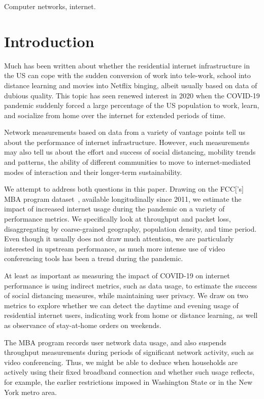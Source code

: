 \documentclass[conference,10pt]{IEEEtran}
\begin{document}
\begin{IEEEkeywords}
Computer networks, internet.
\end{IEEEkeywords}

\glsresetall

\section{Introduction}\label{sec:introduction}

Much has been written about whether the residential internet infrastructure in the \gls{US} can cope with the sudden conversion of work into tele-work, school into distance learning and movies into Netflix binging, albeit usually based on data of dubious quality. This topic has seen renewed interest in 2020 when the COVID-19 pandemic suddenly forced a large percentage of the \gls{US} population to work, learn, and socialize from home over the internet for extended periods of time.

Network measurements based on data from a variety of vantage points tell us about the performance of internet infrastructure. However, such measurements may also tell us about the effort and success of social distancing, mobility trends and patterns, the ability of different communities to move to internet-mediated modes of interaction and their longer-term sustainability.

We attempt to address both questions in this paper. Drawing on the \gls{FCC}['s] \gls{MBA} program dataset~\cite{mba}, available longitudinally since 2011, we estimate the impact of increased internet usage during the pandemic on a variety of performance metrics. We specifically look at throughput and packet loss, disaggregating by coarse-grained geography, population density, and time period. Even though it usually does not draw much attention, we are particularly interested in upstream performance, as much more intense use of video conferencing tools has been a trend during the pandemic.

At least as important as measuring the impact of COVID-19 on internet performance is using indirect metrics, such as data usage, to estimate the success of social distancing measures, while maintaining user privacy. We draw on two metrics to explore whether we can detect the daytime and evening usage of residential internet users, indicating work from home or distance learning, as well as observance of stay-at-home orders on weekends.

The \gls{MBA} program records user network data usage, and also suspends throughput measurements during periods of significant network activity, such as video conferencing. Thus, we might be able to deduce when households are actively using their fixed broadband connection and whether such usage reflects, for example, the earlier restrictions imposed in Washington State or in the New York metro area.
\end{document}
